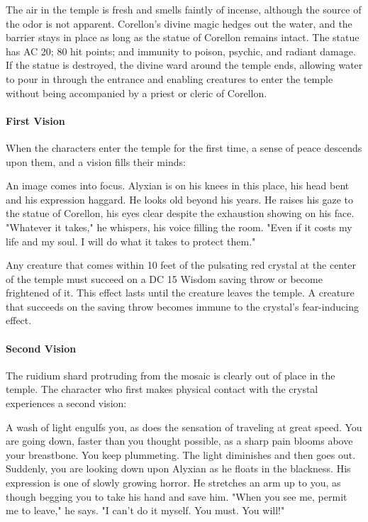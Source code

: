 \documentclass[10pt,a4,twoside,twocolumn,openany,nodeprecatedcode]{dndbook}
\begin{document}
The air in the temple is fresh and smells faintly of incense, although the source of the odor is not apparent. Corellon's divine magic hedges out the water, and the barrier stays in place as long as the statue of Corellon remains intact. The statue has AC 20; 80 hit points; and immunity to poison, psychic, and radiant damage. If the statue is destroyed, the divine ward around the temple ends, allowing water to pour in through the entrance and enabling creatures to enter the temple without being accompanied by a priest or cleric of Corellon.
\paragraph{First Vision}
When the characters enter the temple for the first time, a sense of peace descends upon them, and a vision fills their minds:
\begin{DndReadAloud}{}
An image comes into focus. Alyxian is on his knees in this place, his head bent and his expression haggard. He looks old beyond his years. He raises his gaze to the statue of Corellon, his eyes clear despite the exhaustion showing on his face.
"Whatever it takes," he whispers, his voice filling the room. "Even if it costs my life and my soul. I will do what it takes to protect them."
\end{DndReadAloud}

Any creature that comes within 10 feet of the pulsating red crystal at the center of the temple must succeed on a DC 15 Wisdom saving throw or become frightened of it. This effect lasts until the creature leaves the temple. A creature that succeeds on the saving throw becomes immune to the crystal's fear-inducing effect.
\paragraph{Second Vision}
The ruidium shard protruding from the mosaic is clearly out of place in the temple. The character who first makes physical contact with the crystal experiences a second vision:
\begin{DndReadAloud}{}
A wash of light engulfs you, as does the sensation of traveling at great speed. You are going down, faster than you thought possible, as a sharp pain blooms above your breastbone. You keep plummeting. The light diminishes and then goes out.
Suddenly, you are looking down upon Alyxian as he floats in the blackness. His expression is one of slowly growing horror. He stretches an arm up to you, as though begging you to take his hand and save him.
"When you see me, permit me to leave," he says. "I can't do it myself. You must. You will!"
\end{DndReadAloud}
\end{document}
